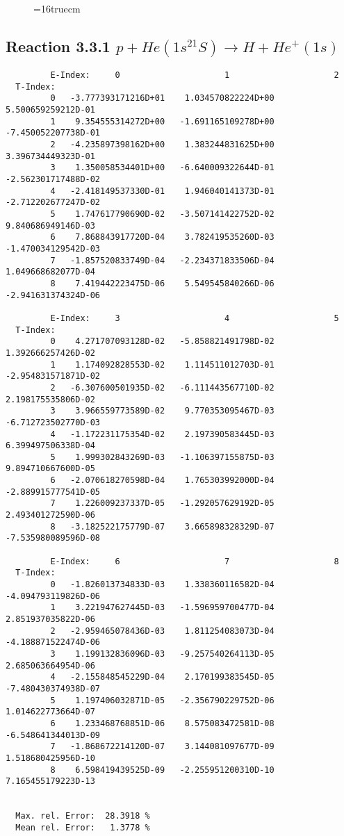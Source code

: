 \documentclass[12pt,dvipdfmx]{article}
\begin{document}
\begin{figure} \label{3.2.3b}
\epsfxsize=16truecm
\end{figure}
\newpage


\subsection{
Reaction 3.3.1  $  p + He(1s^21S) \rightarrow H + He^+(1s)  $
}


\begin{small}\begin{verbatim}
         E-Index:     0                     1                     2
  T-Index:
         0   -3.777393171216D+01    1.034570822224D+00    5.500659259212D-01
         1    9.354555314272D+00   -1.691165109278D+00   -7.450052207738D-01
         2   -4.235897398162D+00    1.383244831625D+00    3.396734449323D-01
         3    1.350058534401D+00   -6.640009322644D-01   -2.562301717488D-02
         4   -2.418149537330D-01    1.946040141373D-01   -2.712202677247D-02
         5    1.747617790690D-02   -3.507141422752D-02    9.840686949146D-03
         6    7.868843917720D-04    3.782419535260D-03   -1.470034129542D-03
         7   -1.857520833749D-04   -2.234371833506D-04    1.049668682077D-04
         8    7.419442223475D-06    5.549545840266D-06   -2.941631374324D-06

         E-Index:     3                     4                     5
  T-Index:
         0    4.271707093128D-02   -5.858821491798D-02    1.392666257426D-02
         1    1.174092828553D-02    1.114511012703D-01   -2.954831571871D-02
         2   -6.307600501935D-02   -6.111443567710D-02    2.198175535806D-02
         3    3.966559773589D-02    9.770353095467D-03   -6.712723502770D-03
         4   -1.172231175354D-02    2.197390583445D-03    6.399497506338D-04
         5    1.999302843269D-03   -1.106397155875D-03    9.894710667600D-05
         6   -2.070618270598D-04    1.765303992000D-04   -2.889915777541D-05
         7    1.226009237337D-05   -1.292057629192D-05    2.493401272590D-06
         8   -3.182522175779D-07    3.665898328329D-07   -7.535980089596D-08

         E-Index:     6                     7                     8
  T-Index:
         0   -1.826013734833D-03    1.338360116582D-04   -4.094793119826D-06
         1    3.221947627445D-03   -1.596959700477D-04    2.851937035822D-06
         2   -2.959465078436D-03    1.811254083073D-04   -4.188871522474D-06
         3    1.199132836096D-03   -9.257540264113D-05    2.685063664954D-06
         4   -2.155848545229D-04    2.170199383545D-05   -7.480430374938D-07
         5    1.197406032871D-05   -2.356790229752D-06    1.014622773664D-07
         6    1.233468768851D-06    8.575083472581D-08   -6.548641344013D-09
         7   -1.868672214120D-07    3.144081097677D-09    1.518680425956D-10
         8    6.598419439525D-09   -2.255951200310D-10    7.165455179223D-13


  Max. rel. Error:  28.3918 %
  Mean rel. Error:   1.3778 %
\end{verbatim}\end{small}
\end{document}
